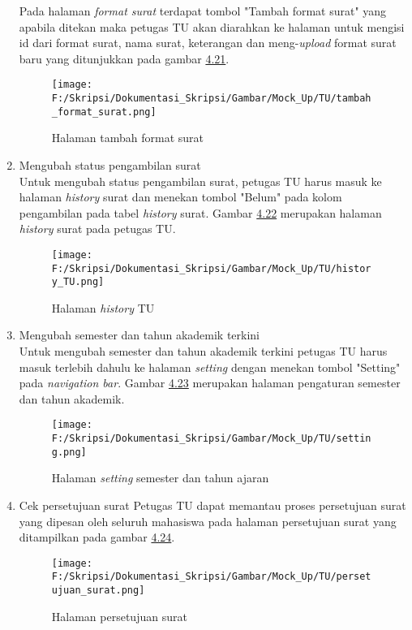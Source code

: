 \begin{enumerate}
	Pada halaman \textit{format surat} terdapat tombol "Tambah format surat" yang apabila ditekan maka petugas TU akan diarahkan ke halaman untuk mengisi id dari format surat, nama surat, keterangan dan meng-\textit{upload} format surat baru yang ditunjukkan pada gambar \hyperlink{halaman_tambah_format_surat}{4.21}.
	\begin{figure}[H]
	\centering
		\texttt{[image: F:/Skripsi/Dokumentasi\_Skripsi/Gambar/Mock\_Up/TU/tambah\_format\_surat.png]}
		\caption{Halaman tambah format surat}
		\label{fig:halaman_tambah_format_surat}
	\end{figure}
	
	\item Mengubah status pengambilan surat\\
	Untuk mengubah status pengambilan surat, petugas TU harus masuk ke halaman \textit{history} surat dan menekan tombol "Belum" pada kolom pengambilan pada tabel \textit{history} surat. Gambar \hyperlink{halaman_history_TU}{4.22} merupakan halaman \textit{history} surat pada petugas TU.
	\begin{figure}[H]
	\centering
		\texttt{[image: F:/Skripsi/Dokumentasi\_Skripsi/Gambar/Mock\_Up/TU/history\_TU.png]}
		\caption{Halaman \textit{history} TU}
		\label{fig:halaman_history_TU}
	\end{figure}
	
	\item Mengubah semester dan tahun akademik terkini \\
	Untuk mengubah semester dan tahun akademik terkini petugas TU harus masuk terlebih dahulu ke halaman \textit{setting} dengan menekan tombol "Setting" pada \textit{navigation bar}. Gambar \hyperlink{setting}{4.23} merupakan halaman pengaturan semester dan tahun akademik.
	\begin{figure}[H]
	\centering
		\texttt{[image: F:/Skripsi/Dokumentasi\_Skripsi/Gambar/Mock\_Up/TU/setting.png]}
		\caption{Halaman \textit{setting} semester dan tahun ajaran}
		\label{fig:setting}
	\end{figure}
	
	\item Cek persetujuan surat
	Petugas TU dapat memantau proses persetujuan surat yang dipesan oleh seluruh mahasiswa pada halaman persetujuan surat yang ditampilkan pada gambar \hyperlink{halaman_persetujuan_surat}{4.24}.
	\begin{figure}[H]
	\centering
		\texttt{[image: F:/Skripsi/Dokumentasi\_Skripsi/Gambar/Mock\_Up/TU/persetujuan\_surat.png]}
		\caption{Halaman persetujuan surat}
		\label{fig:halaman_persetujuan_surat}
	\end{figure}
\end{enumerate}
